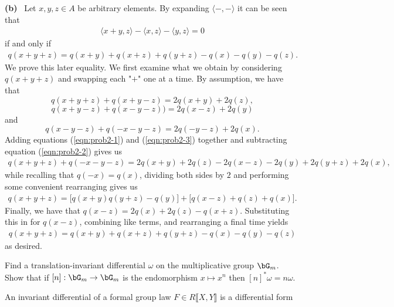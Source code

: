 \begin{homework}[e]
\begin{prf}
		\noindent \textbf{(b)}~ Let $x,y,z \in A$ be arbitrary elements. By expanding $\langle -,- \rangle$ it can be seen that
		\begin{align*}
			\langle x+y,z\rangle - \langle x,z \rangle - \langle y,z \rangle = 0
		\end{align*}
		if and only if
		\begin{align*}
			q(x+y+z) = q(x+y) + q(x+z) + q(y+z) - q(x) - q(y) - q(z).
		\end{align*}
		We prove this later equality. We first examine what we obtain by considering $q(x+y+z)$ and swapping each "$+$" one at a time. By assumption, we have that
		\begin{equation}\label{eqn:prob2-1}
			q(x+y+z) + q(x+y-z) = 2q(x+y) + 2q(z),
		\end{equation}
		\begin{equation}\label{eqn:prob2-2}
			q(x+y-z)+q(x-y-z)) = 2q(x - z) + 2q(y)
		\end{equation}
		and
		\begin{equation}\label{eqn:prob2-3}
			q(x - y - z) + q(- x - y - z) = 2q(-y-z)+2q(x).
		\end{equation}
		Adding equations (\ref{eqn:prob2-1}) and (\ref{eqn:prob2-3}) together and subtracting equation (\ref{eqn:prob2-2}) gives us
		\begin{align*}
			q(x+y+z) + q(-x-y-z) = 2q(x+y) + 2q(z) - 2q(x-z) - 2q(y) + 2q(y+z) + 2q(x),
		\end{align*}
		while recalling that $q(-x) = q(x)$, dividing both sides by $2$ and performing some convenient rearranging gives us
		\begin{align*}
			q(x+y+z) = \big[q(x+y) q(y+z) - q(y)\big] + \big[q(x - z) + q(z) + q(x)\big].
		\end{align*}
		Finally, we have that $q(x - z) = 2q(x) + 2q(z) - q(x + z)$. Substituting this in for $q(x-z)$, combining like terms, and rearranging a final time yields
		\begin{align*}
			q(x+y+z) = q(x+y) + q(x+z) + q(y+z) - q(x) - q(y) - q(z)
		\end{align*}
		as desired.
	\end{prf}
	\prob Find a translation-invariant differential $\omega$ on the multiplicative group $\bG_m$. Show that if $[n]:\bG_m \to \bG_m$ is the endomorphism $x \mapsto x^n$ then $[n]^*\omega = n\omega$.
	\begin{prf}
		An invariant differential of a formal group law $F \in R\llbracket X,Y\rrbracket$ is a differential form
		\begin{align*}

\end{align*}
\end{prf}
\end{homework}
